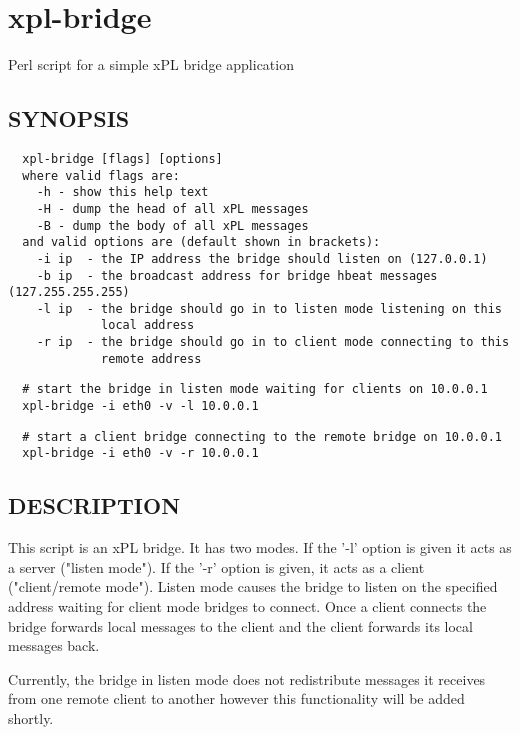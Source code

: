 \section{xpl-bridge\label{xpl-bridge}}


Perl script for a simple xPL bridge application

\subsection*{SYNOPSIS\label{xpl-bridge_SYNOPSIS}}
\begin{verbatim}
  xpl-bridge [flags] [options]
  where valid flags are:
    -h - show this help text
    -H - dump the head of all xPL messages
    -B - dump the body of all xPL messages
  and valid options are (default shown in brackets):
    -i ip  - the IP address the bridge should listen on (127.0.0.1)
    -b ip  - the broadcast address for bridge hbeat messages (127.255.255.255)
    -l ip  - the bridge should go in to listen mode listening on this
             local address
    -r ip  - the bridge should go in to client mode connecting to this
             remote address
\end{verbatim}
\begin{verbatim}
  # start the bridge in listen mode waiting for clients on 10.0.0.1
  xpl-bridge -i eth0 -v -l 10.0.0.1
\end{verbatim}
\begin{verbatim}
  # start a client bridge connecting to the remote bridge on 10.0.0.1
  xpl-bridge -i eth0 -v -r 10.0.0.1
\end{verbatim}
\subsection*{DESCRIPTION\label{xpl-bridge_DESCRIPTION}}


This script is an xPL bridge.  It has two modes.  If the '-l' option
is given it acts as a server ("listen mode").  If the '-r' option is
given, it acts as a client ("client/remote mode").  Listen mode causes
the bridge to listen on the specified address waiting for client mode
bridges to connect.  Once a client connects the bridge forwards local
messages to the client and the client forwards its local messages
back.



Currently, the bridge in listen mode does not redistribute messages it
receives from one remote client to another however this functionality
will be added shortly.

